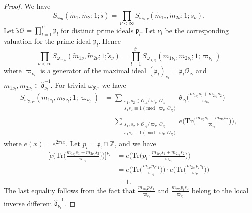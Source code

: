 \documentclass[10pt,a4paper]{amsart}
\begin{document}
\begin{proof}
We have $$S_{\omega_\mathfrak{N}} (\tilde{m}_1,\tilde{m}_2;1;\tilde{s})=\prod _{\nu<\infty } S_{\omega_{\mathfrak{N},\nu}} (\tilde{m}_{1\nu},\tilde{m}_{2\nu};1;\tilde{s}_\nu).$$ Let $\tilde{s}\mathcal{O}=\prod_{l=1}^{t'}\mathfrak{p}_l$ for distinct prime ideals $\mathfrak{p}_l.$  Let $\nu_l$ be the corresponding valuation for the prime ideal $\mathfrak{p}_l.$ Hence 
$$
\prod _{\nu<\infty } S_{\omega_{\mathfrak{N},\nu}} (\tilde{m}_{1\nu},\tilde{m}_{2\nu};1;\tilde{s}_\nu)=\prod_{l=1}^{t'} S_{\omega_{\mathfrak{N},\nu_l}} (m_{1\nu_l},m_{2\nu_l};1;\varpi_{\nu_l})
$$
where $\varpi_{\nu_l}$ is a generator of the maximal ideal $(\mathfrak{p}_l)_{\nu_l}=\mathfrak{p}_l\mathcal{O}_{\nu_l}$ and   $m_{1\nu_l},m_{2\nu_l} \in  \hat{\mathfrak{d}}_{\nu_l}^{-1}.$ 
For trivial $\omega_\mathfrak{N},$ we have 
\begin{align*}
S_{\omega_{\mathfrak{N},\nu_l}} (m_{1\nu_l},m_{2\nu_l};1;\varpi_{\nu_l})&=\sum_{\substack{ s_{1},s_{2}\in \mathcal{O}_{\nu_l} / \varpi_{\nu_l} \mathcal{O}_{\nu_l}  \\{s_1s_2\equiv 1 \pmod {\varpi_{\nu_l}\mathcal{O}_{\nu_l}} }} }\theta_{\nu_l} \Big(\frac{m_{1\nu_l} s_{1}+m_{2\nu_l} s_{2}}{\varpi_{\nu_l}}\Big) \\
&=\sum_{\substack{ s_{1},s_{2}\in \mathcal{O}_{\nu_l} / \varpi_{\nu_l} \mathcal{O}_{\nu_l}  \\{s_1s_2\equiv 1 \pmod {\varpi_{\nu_l}\mathcal{O}_{\nu_l}} }} } e\Bigg(\text{Tr}\Big( \frac{m_{1\nu_l} s_{1}+m_{2\nu_l} s_{2}}{\varpi_{\nu_l}}  \Big)\Bigg),
\end{align*}
where $e(x)=e^{2\pi i x}.$
 Let $p_l=\mathfrak{p}_l \cap \mathbb{Z}$, and we have 
\begin{align*}
\Bigg[e\Bigg(\mathrm{Tr}\Big( \frac{m_{1\nu_l} s_{1}+m_{2\nu_l} s_{2}}{\varpi_{\nu_l}}  \Big)\Bigg)\Bigg]^{p_l} &= 
e\Bigg( \mathrm{Tr}\Big( p_l \cdot  \frac{m_{1\nu_l} s_{1}+m_{2\nu_l} s_{2}}{\varpi_{\nu_l}}  \Big)\Bigg) \\
&= e\Bigg( \mathrm{Tr}\Big(   \frac{m_{1  \nu_l}p_ls_{1}}{\varpi_{\nu_l}}  \Big)\Bigg)\cdot e\Bigg( \mathrm{Tr}\Big(   \frac{m_{2  \nu_l}p_ls_{2}}{\varpi_{\nu_l}}  \Big)\Bigg)\\
&= 1.
\end{align*}
The last equality follows from the fact that $ \frac{m_{1  \nu_l}p_ls_{1}}{\varpi_{\nu_l}} $ and $   \frac{m_{2  \nu_l}p_ls_{2}}{\varpi_{\nu_l}}$ belong to the local inverse different $ \hat{\mathfrak{d}}_{\nu_l}^{-1}$.


\end{proof}
\end{document}
